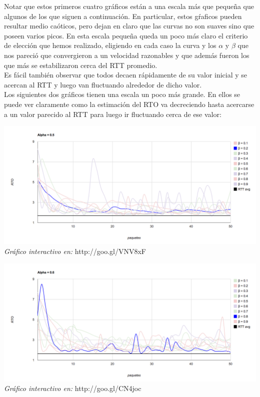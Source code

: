\indent Notar que estos primeros cuatro gráficos están a una escala más que pequeña que algunos de los que siguen a continuación. En particular, estos gŕaficos pueden resultar medio caóticos, pero dejan en claro que las curvas no son suaves sino que poseen varios picos. En esta escala pequeña queda un poco más claro el criterio de elección que hemos realizado, eligiendo en cada caso la curva y los $\alpha$ y $\beta$ que nos pareció que convergieron a un velocidad razonables y que además fueron los que más se estabilizaron cerca del RTT promedio.\\
\indent Es fácil también observar que todos decaen rápidamente de su valor inicial y se acercan al RTT y luego van fluctuando alrededor de dicho valor.\\
\indent Los siguientes dos gráficos tienen una escala un poco más grande. En ellos se puede ver claramente como la estimación del RTO va decreciendo hasta acercarse a un valor parecido al RTT para luego ir fluctuando cerca de ese valor:\\	

\begin{center}
	\includegraphics[scale=0.35]{graphics/rto_vs_paquetes_a_5.png}
	\textit{Gráfico interactivo en:} http://goo.gl/VNV8xF
\end{center}

\begin{center}
	\includegraphics[scale=0.35]{graphics/rto_vs_paquetes_a_6.png}
	\textit{Gráfico interactivo en:} http://goo.gl/CN4joc
\end{center}



